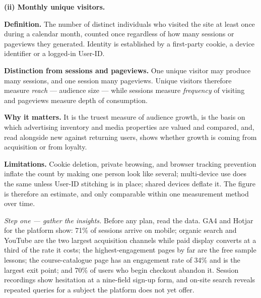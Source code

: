 \begin{qlist}
\textbf{(ii) Monthly unique visitors.}
\begin{apts}\setcounter{enumi}{5}
\item \textbf{Definition.} The number of distinct individuals who visited the
      site at least once during a calendar month, counted once regardless of
      how many sessions or pageviews they generated. Identity is established by
      a first-party cookie, a device identifier or a logged-in User-ID.
\item \textbf{Distinction from sessions and pageviews.} One unique visitor may
      produce many sessions, and one session many pageviews. Unique visitors
      therefore measure \emph{reach} --- audience size --- while sessions
      measure \emph{frequency} of visiting and pageviews measure depth of
      consumption.
\item \textbf{Why it matters.} It is the truest measure of audience growth, is
      the basis on which advertising inventory and media properties are valued
      and compared, and, read alongside new against returning users, shows
      whether growth is coming from acquisition or from loyalty.
\item \textbf{Limitations.} Cookie deletion, private browsing, and browser
      tracking prevention inflate the count by making one person look like
      several; multi-device use does the same unless User-ID stitching is in
      place; shared devices deflate it. The figure is therefore an estimate,
      and only comparable within one measurement method over time.
\end{apts}

\textit{Step one --- gather the insights.} Before any plan, read the data. GA4
and Hotjar for the platform show: 71\% of sessions arrive on mobile; organic
search and YouTube are the two largest acquisition channels while paid display
converts at a third of the rate it costs; the highest-engagement pages by far
are the free sample lessons; the course-catalogue page has an engagement rate
of 34\% and is the largest exit point; and 70\% of users who begin checkout
abandon it. Session recordings show hesitation at a nine-field sign-up form,
and on-site search reveals repeated queries for a subject the platform does not
yet offer.


\end{qlist}
